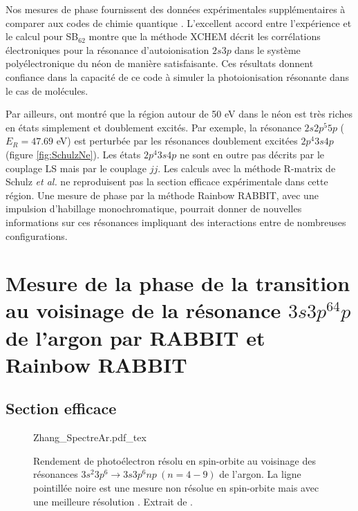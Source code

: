 Nos mesures de phase fournissent des données expérimentales supplémentaires à comparer aux codes de chimie quantique . L'excellent accord entre l'expérience et le calcul pour SB$_{62}$ montre que la méthode XCHEM décrit les corrélations électroniques pour la résonance d'autoionisation $2s3p$ dans le système polyélectronique du néon de manière satisfaisante. Ces résultats donnent confiance dans la capacité de ce code à simuler la photoionisation résonante dans le cas de molécules.

Par ailleurs,  ont montré que la région autour de 50 eV dans le néon est très riches en états simplement et doublement excités. Par exemple, la résonance $2s2p^{5}5p$ ($E_R = 47.69$ eV) est perturbée par les résonances doublement excitées $2p^{4}3s4p$ (figure \ref{fig:SchulzNe}). Les états $2p^{4}3s4p$ ne sont en outre pas décrits par le couplage LS mais par le couplage $jj$. Les calculs avec la méthode R-matrix de Schulz \textit{et al.} ne reproduisent pas la section efficace expérimentale dans cette région. Une mesure de phase par la méthode Rainbow RABBIT, avec une impulsion d'habillage monochromatique, pourrait donner de nouvelles informations sur ces résonances impliquant des interactions entre de nombreuses configurations. 





\chapter[Mesure de la phase de la transition au voisinage de la résonance $3s3p^64p$ de l'argon par RABBIT et Rainbow RABBIT]{Mesure de la phase de la transition au voisinage de la résonance \MakeLowercase{$3s3p^64p$} de l'argon par RABBIT et Rainbow RABBIT}

\section{Section efficace}
\begin{figure}
\centering
\def\svgwidth{0.85\textwidth}
{Zhang_SpectreAr.pdf_tex}
\caption{Rendement de photoélectron résolu en spin-orbite au voisinage des résonances $3s^2 3p^6 \rightarrow 3s 3p^6 np \: (n = 4 - 9) $ de l'argon. La ligne pointillée noire est une mesure non résolue en spin-orbite mais avec une meilleure résolution . Extrait de .}
\label{fig:Zhang_SpectreAr}
\end{figure}

